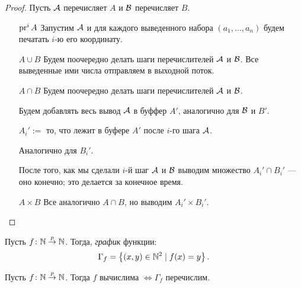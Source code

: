 \begin{proof}
    Пусть $\mathcal{A}$ перечисляет $A$ и $\mathcal{B}$ перечисляет $B$.

    \begin{itemize}
        \item[$\operatorname{\mathop{\mathrm{pr}}}^i A$]
            Запустим $\mathcal{A}$ и для каждого выведенного набора $(a_1, \dots, a_n)$ будем печатать $i$-ю его координату.
        \item[$A \cup B$]
            Будем поочередно делать шаги перечислителей $\mathcal{A}$ и $\mathcal{B}$.
            Все выведенные ими числа отправляем в выходной поток.
        \item[$A \cap B$]
            Будем поочередно делать шаги перечислителей $\mathcal{A}$ и $\mathcal{B}$.

            Будем добавлять весь вывод $\mathcal{A}$ в буффер $A'$, аналогично для $\mathcal{B}$ и $B'$.

            $A_i' := $ то, что лежит в буфере $A'$ после $i$-го шага $\mathcal{A}$.

            Аналогично для $B_i'$.

            После того, как мы сделали $i$-й шаг $\mathcal{A}$ и $\mathcal{B}$ выводим множество $A_i' \cap B_i'$ --- оно конечно; это делается за конечное время.

        \item[$A \times B$]
            Все аналогично $A \cap B$, но выводим $A_i' \times B_i'$.
            \qedhere
    \end{itemize}
\end{proof}


\begin{definition}
    Пусть $f \colon \mathbb{N} \overset{p}{\to} \mathbb{N}$.
    Тогда, \textit{график} функции:
    \begin{equation*}
        \Gamma_f = \left\{(x, y) \in \mathbb{N}^2 \mid f(x) = y\right\}
    .\end{equation*}
\end{definition}

\begin{theorem}[о графике]
    Пусть $f \colon \mathbb{N} \overset{p}{\to} \mathbb{N}$. Тогда $f$ вычислима $\iff \Gamma_f$ перечислим.
\end{theorem}

